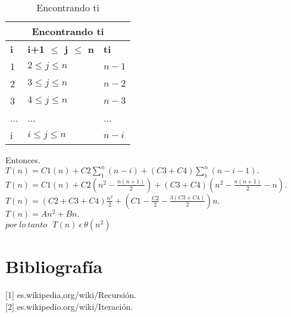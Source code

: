 \documentclass[12pt]{report}
\begin{document}
\begin{table}[htbp]
	\begin{center}
		\begin{tabular}{|l|l|l|}
			\hline
			\multicolumn{3}{|c|}{Encontrando ti} \\ 
			\hline
			\textbf{i} & \textbf{i+1 $\leq$ j $\leq$ n} & \textbf{ti}\\
			\hline
			1 & $2 \leq j \leq n$ & $n-1$ \\ \hline
			2 & $3 \leq j \leq n$ & $n-2$ \\ \hline
			3 & $4 \leq j \leq n$ & $n-3$ \\ \hline
			... & ... & ... \\ \hline
			i & $i \leq j \leq n$ & $n-i$ \\ \hline
		\end{tabular}
		\caption{Encontrando ti}
	\end{center}
\end{table}

Entonces.\\
$T(n)=C1(n)+C2\sum_{1}^{n}(n-i)+(C3+C4)\sum_{1}^{n}(n-i-1).$\\
$T(n)=C1(n)+C2(n^{2}-\frac{n(n+1)}{2})+(C3+C4)(n^{2}-\frac{n(n+1)}{2}-n).$\\
$T(n)=(C2+C3+C4)\frac{n^{2}}{2}+(C1-\frac{C2}{2}-\frac{3(C3+C4)}{2})n.$\\
$T(n)=An^{2}+Bn.$\\

$ por \ lo \ tanto \ \ \ T(n) \ \epsilon \ \theta (n^{2})$
	
	\section{Bibliografía}
	
	[1] es.wikipedia,org/wiki/Recursión.\\
	
	[2] es.wikipedio.org/wiki/Iteración.
	
\end{document}
